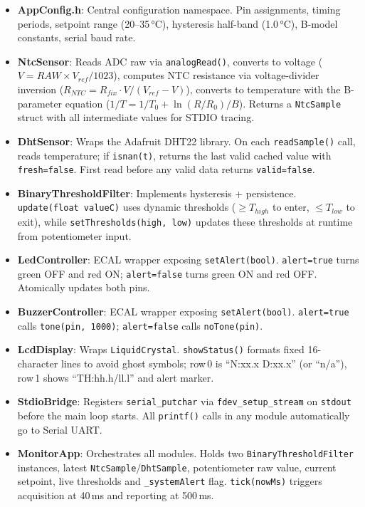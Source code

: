 \documentclass[12pt]{article}
\begin{document}
\begin{itemize}
    \item \textbf{AppConfig.h}: Central configuration namespace. Pin assignments, timing periods, setpoint range (20--35\,°C), hysteresis half-band (1.0\,°C), B-model constants, serial baud rate.

    \item \textbf{NtcSensor}: Reads ADC raw via \texttt{analogRead()}, converts to voltage ($V = RAW \times V_{ref}/1023$), computes NTC resistance via voltage-divider inversion ($R_{NTC} = R_{fix} \cdot V / (V_{ref}-V)$), converts to temperature with the B-parameter equation ($1/T = 1/T_0 + \ln(R/R_0)/B$). Returns a \texttt{NtcSample} struct with all intermediate values for STDIO tracing.

    \item \textbf{DhtSensor}: Wraps the Adafruit DHT22 library. On each \texttt{readSample()} call, reads temperature; if \texttt{isnan(t)}, returns the last valid cached value with \texttt{fresh=false}. First read before any valid data returns \texttt{valid=false}.

    \item \textbf{BinaryThresholdFilter}: Implements hysteresis + persistence. \texttt{update(float valueC)} uses dynamic thresholds ($\geq T_{high}$ to enter, $\leq T_{low}$ to exit), while \texttt{setThresholds(high, low)} updates these thresholds at runtime from potentiometer input.

    \item \textbf{LedController}: ECAL wrapper exposing \texttt{setAlert(bool)}. \texttt{alert=true} turns green OFF and red ON; \texttt{alert=false} turns green ON and red OFF. Atomically updates both pins.

    \item \textbf{BuzzerController}: ECAL wrapper exposing \texttt{setAlert(bool)}. \texttt{alert=true} calls \texttt{tone(pin, 1000)}; \texttt{alert=false} calls \texttt{noTone(pin)}.

    \item \textbf{LcdDisplay}: Wraps \texttt{LiquidCrystal}. \texttt{showStatus()} formats fixed 16-character lines to avoid ghost symbols; row\,0 is ``N:xx.x D:xx.x'' (or ``n/a''), row\,1 shows ``TH:hh.h/ll.l'' and alert marker.

    \item \textbf{StdioBridge}: Registers \texttt{serial\_putchar} via \texttt{fdev\_setup\_stream} on \texttt{stdout} before the main loop starts. All \texttt{printf()} calls in any module automatically go to Serial UART.

    \item \textbf{MonitorApp}: Orchestrates all modules. Holds two \texttt{BinaryThresholdFilter} instances, latest \texttt{NtcSample}/\texttt{DhtSample}, potentiometer raw value, current setpoint, live thresholds and \texttt{\_systemAlert} flag. \texttt{tick(nowMs)} triggers acquisition at 40\,ms and reporting at 500\,ms.
\end{itemize}
\end{document}
